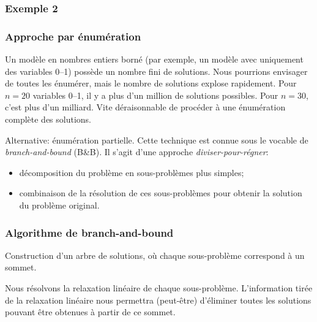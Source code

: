 \documentclass[usepdftitle=false]{beamer}
\begin{document}
\begin{frame}
\frametitle{Exemple 2}

\begin{center}
\end{center}

\end{frame}

\begin{frame}
\frametitle{Approche par énumération}

Un modèle en nombres entiers borné (par exemple, un modèle avec uniquement des variables 0--1) possède un nombre fini de solutions.
Nous pourrions envisager de toutes les énumérer, mais le nombre de solutions explose rapidement. Pour $n = 20$ variables 0--1, il y a plus d'un million de solutions possibles.
Pour $n=30$, c'est plus d'un milliard.
Vite déraisonnable de procéder à une énumération complète des solutions.

\mbox{}

Alternative: énumération partielle.
Cette technique est connue sous le vocable de {\sl branch-and-bound} (B\&B).
Il s'agit d'une approche {\sl diviser-pour-régner}:
\begin{itemize}
\item
décomposition du problème en sous-problèmes plus simples;
\item
combinaison de la résolution de ces sous-problèmes pour obtenir la solution du problème original.
\end{itemize}

\end{frame}

\begin{frame}
\frametitle{Algorithme de branch-and-bound}

Construction d'un arbre de solutions, où chaque sous-problème correspond à un sommet.

\mbox{}

Nous résolvons la relaxation linéaire de chaque sous-problème.
L'information tirée de la relaxation linéaire nous permettra (peut-être) d'éliminer toutes les solutions pouvant être obtenues à partir de ce sommet.

\end{frame}
\end{document}
